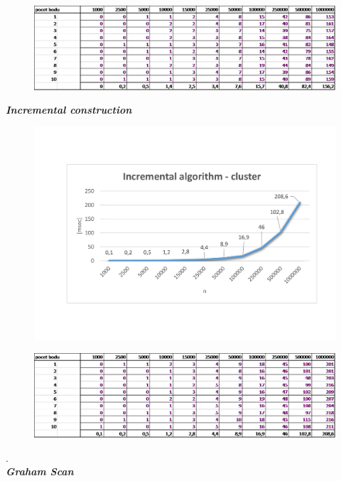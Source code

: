 \documentclass{article}
\begin{document}
\begin{figure}[htbp]
\centering
        \includegraphics[clip, trim=0cm 0cm 0cm 0cm, width=1\textwidth]{qc.png}
\end{figure}
\clearpage
\newpage
\textit{\textbf {Incremental construction}}
\\
\begin{figure}[htbp]
\centering
        \includegraphics[clip, trim=0cm 0cm 0cm 0cm, width=1\textwidth]{ic.pdf}
\end{figure}
\begin{figure}[htbp]
\centering
        \includegraphics[clip, trim=0cm 0cm 0cm 0cm, width=1\textwidth]{ic.png}
\end{figure}
.\\
\clearpage
\newpage
\textit{\textbf {Graham Scan}}
\\
\end{document}
